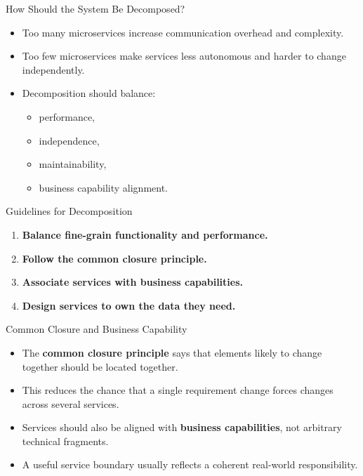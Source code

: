 \begin{frame}{How Should the System Be Decomposed?}
\begin{itemize}
    \item Too many microservices increase communication overhead and complexity.
    \item Too few microservices make services less autonomous and harder to change independently.
    \item Decomposition should balance:
    \begin{itemize}
        \item performance,
        \item independence,
        \item maintainability,
        \item business capability alignment.
    \end{itemize}
\end{itemize}
\end{frame}

\begin{frame}{Guidelines for Decomposition}
\begin{enumerate}
    \item \textbf{Balance fine-grain functionality and performance.}
    \item \textbf{Follow the common closure principle.}
    \item \textbf{Associate services with business capabilities.}
    \item \textbf{Design services to own the data they need.}
\end{enumerate}
\end{frame}

\begin{frame}{Common Closure and Business Capability}
\begin{itemize}
    \item The \textbf{common closure principle} says that elements likely to change together should be located together.
    \item This reduces the chance that a single requirement change forces changes across several services.
    \item Services should also be aligned with \textbf{business capabilities}, not arbitrary technical fragments.
    \item A useful service boundary usually reflects a coherent real-world responsibility.
\end{itemize}
\end{frame}

